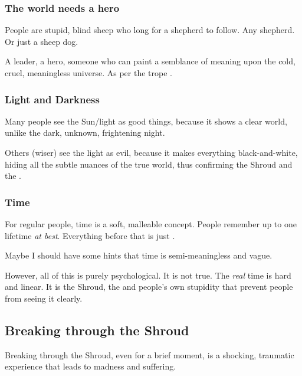 \subsubsection{The world needs a hero}
People are stupid, blind sheep who long for a shepherd to follow. Any shepherd. Or just a sheep dog. 

A leader, a hero, someone who can paint a semblance of meaning upon the cold, cruel, meaningless universe. As per the trope .







\subsubsection{Light and Darkness}
Many people see the Sun/light as good things, because it shows a clear world, unlike the dark, unknown, frightening night.

Others (wiser) see the light as evil, because it makes everything black-and-white, hiding all the subtle nuances of the true world, thus confirming the Shroud and the .







\subsubsection{Time}
For regular people, time is a soft, malleable concept. People remember up to one lifetime \emph{at best}. Everything before that is just . 

Maybe I should have some hints that time is semi-meaningless and vague. 

However, all of this is purely psychological. It is not true. The \emph{real} time is hard and linear. It is the Shroud, the \Sephiroth{} and people's own stupidity that prevent people from seeing it clearly. 









\subsection{Breaking through the Shroud}
Breaking through the Shroud, even for a brief moment, is a shocking, traumatic experience that leads to madness and suffering.

